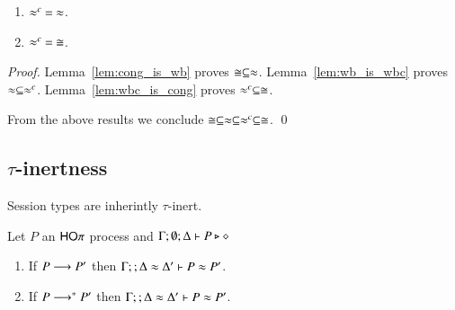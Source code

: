 
\begin{theorem}[Concidence]
	\begin{enumerate}
		\item	$\approx^{c}\ =\ \approx$.
		\item	$\approx^{c}\ =\ \cong$.
	\end{enumerate}
\end{theorem}

\begin{proof}
	\noi	Lemma~\ref{lem:cong_is_wb} proves $\cong \subseteq \approx$.
		Lemma~\ref{lem:wb_is_wbc} proves $\approx \subseteq \approx^{c}$.
		Lemma~\ref{lem:wbc_is_cong} proves $\approx^{c} \subseteq \cong$.

	\noi From the above results we conclude $\cong \subseteq \approx \subseteq \approx^{c} \subseteq \cong$. 
	\qed
\end{proof}


\subsection{$\tau$-inertness}

Session types are inherintly $\tau$-inert.

\begin{lemma}\rm
	\label{lem:tau_inert}
	Let $P$ an $\mathsf{HO}\pi$ process
	and $\Gamma; \emptyset; \Delta \vdash P \triangleright \diamond$
	\begin{enumerate}
		\item	If $P \longrightarrow P'$ then $\Gamma; \empty; \Delta \wb \Delta' \proves P \wb P'$.
		\item	If $P \longrightarrow^* P'$ then $\Gamma; \empty; \Delta \wb \Delta' \proves P \wb P'$.
	\end{enumerate}
\end{lemma}

